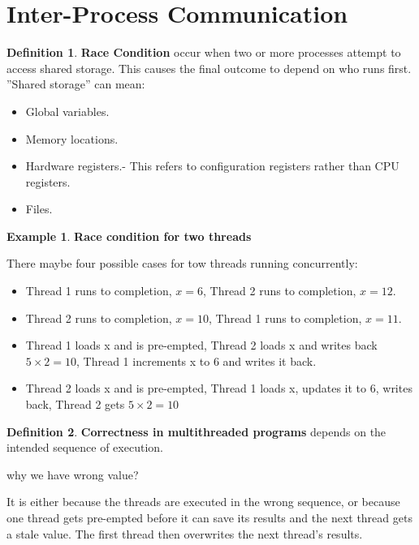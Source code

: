 \documentclass[11pt,a4paper]{article}
\theoremstyle{definition}
\newtheorem{definition}{Definition}[section]
\newtheorem{example}{Example}[section]
\newenvironment{myitemize}
{ \begin{itemize}
    \setlength{\itemsep}{5pt}
    \setlength{\parskip}{0pt}
    \setlength{\parsep}{0pt}     }
{ \end{itemize}                  }
\begin{document}
\section{Inter-Process Communication}
\begin{definition}{\textbf{Race Condition}}
	occur when two or more processes attempt to access shared storage. This causes the final outcome to depend on who runs first. ''Shared storage'' can mean:
	\begin{myitemize}
		\item Global variables.
		\item Memory locations.
		\item Hardware registers.- This refers to configuration registers rather than CPU registers.
		\item Files.
	\end{myitemize}
\end{definition}

\begin{example}{\textbf{Race condition for two threads}}
	
	There maybe four possible cases for tow threads running concurrently:
	\begin{myitemize}
		\item Thread 1 runs to completion, $x=6$, Thread 2 runs to completion, $x = 12$.
		\item Thread 2 runs to completion, $x = 10$, Thread 1 runs to completion, $x = 11$.
		\item Thread 1 loads x and is pre-empted, Thread 2 loads x and writes back $5 \times 2 = 10$, Thread 1 increments x to 6 and writes it back.
		\item Thread  2 loads x and is pre-empted, Thread 1 loads x, updates it to 6, writes back, Thread 2 gets $5 \times 2 = 10$
	\end{myitemize}
\end{example}

\begin{definition}{\textbf{Correctness in multithreaded programs}}
	depends on the intended sequence of execution.
\end{definition}

\begin{tcolorbox}

\textsf{why we have wrong value?}
	
	It is either because the threads are executed in the wrong sequence, or because one thread gets pre-empted before it can save its results and the next thread gets a stale value. The first thread then overwrites the next thread’s results.
\end{tcolorbox}
\end{document}
